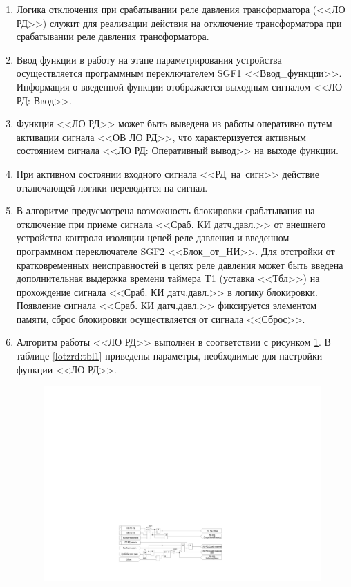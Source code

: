 \documentclass[a4paper, 12pt,table, hidelinks, DIV=calc]{extarticle} %
\begin{document}
\begin{enumerate}[label=\arabic{section}.\arabic{subsection}.\arabic{enumi}, labelsep=4pt, leftmargin=0pt, itemindent=57pt, itemsep=0pt, parsep=5pt]
\begin{enumerate}[label=\arabic{section}.\arabic{subsection}.\arabic{enumi}.\arabic*, labelsep=4pt, leftmargin=0em, itemindent=65pt, parsep=0pt]
\item
Логика отключения при срабатывании реле давления трансформатора (<<ЛО РД>>) служит для реализации действия на отключение трансформатора при срабатывании реле давления трансформатора.
\item
Ввод функции в работу на этапе параметрирования устройства осуществляется программным переключателем SGF1 <<Ввод\_функции>>. Информация о введенной функции отображается выходным сигналом <<ЛО РД: Ввод>>.
\item
Функция <<ЛО РД>> может быть выведена из работы оперативно путем активации сигнала <<ОВ ЛО РД>>, что характеризуется активным состоянием сигнала <<ЛО РД: Оперативный вывод>> на выходе функции.
\item
При активном состоянии входного сигнала <<РД~на~сигн>> действие отключающей логики переводится на сигнал.
\item
В алгоритме предусмотрена возможность блокировки срабатывания на отключение при приеме сигнала <<Сраб. КИ датч.давл.>> от внешнего устройства контроля изоляции цепей реле давления и введенном программном переключателе SGF2 <<Блок\_от\_НИ>>. Для отстройки от кратковременных неисправностей в цепях реле давления может быть введена дополнительная выдержка времени таймера T1 (уставка <<Тбл>>) на прохождение сигнала <<Сраб. КИ датч.давл.>> в логику блокировки. 
Появление сигнала <<Сраб. КИ датч.давл.>> фиксируется элементом памяти, сброс блокировки осуществляется от сигнала <<Сброс>>.

\item
Алгоритм работы <<ЛО РД>> выполнен в соответствии с рисунком \ref{lotzrd:img1}. В таблице \ref{lotzrd:tbl1} приведены параметры, необходимые для настройки функции <<ЛО РД>>.

\vspace{3mm}
\begin{figure}[H]
\centering
\includegraphics[width=1\textwidth,height=1\textheight,keepaspectratio]{img25.pdf}
\label{lotzrd:img1}
\end{figure}


\end{enumerate}
\end{enumerate}
\end{document}
